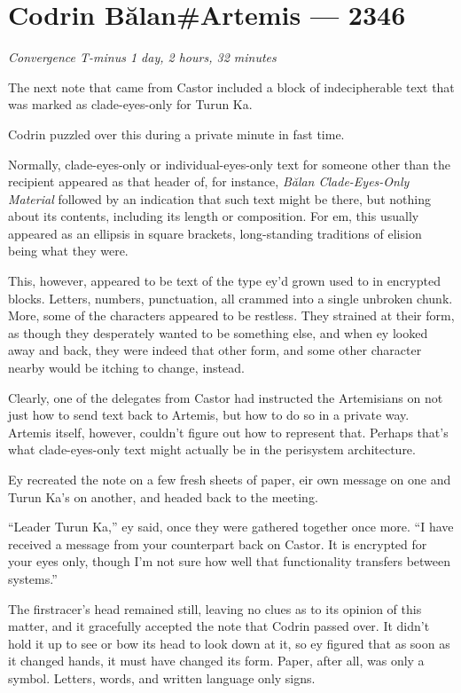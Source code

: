\hypertarget{codrin-bux103lanartemis-2346}{%
\chapter{Codrin Bălan\#Artemis — 2346}}

\begin{center}
\emph{Convergence T-minus 1 day, 2 hours, 32 minutes}
\end{center}

\noindent The next note that came from Castor included a block of indecipherable text that was marked as clade-eyes-only for Turun Ka.

Codrin puzzled over this during a private minute in fast time.

Normally, clade-eyes-only or individual-eyes-only text for someone other than the recipient appeared as that header of, for instance, \emph{Bălan Clade-Eyes-Only Material} followed by an indication that such text might be there, but nothing about its contents, including its length or composition. For em, this usually appeared as an ellipsis in square brackets, long-standing traditions of elision being what they were.

This, however, appeared to be text of the type ey'd grown used to in encrypted blocks. Letters, numbers, punctuation, all crammed into a single unbroken chunk. More, some of the characters appeared to be restless. They strained at their form, as though they desperately wanted to be something else, and when ey looked away and back, they were indeed that other form, and some other character nearby would be itching to change, instead.

Clearly, one of the delegates from Castor had instructed the Artemisians on not just how to send text back to Artemis, but how to do so in a private way. Artemis itself, however, couldn't figure out how to represent that. Perhaps that's what clade-eyes-only text might actually be in the perisystem architecture.

Ey recreated the note on a few fresh sheets of paper, eir own message on one and Turun Ka's on another, and headed back to the meeting.

``Leader Turun Ka,'' ey said, once they were gathered together once more. ``I have received a message from your counterpart back on Castor. It is encrypted for your eyes only, though I'm not sure how well that functionality transfers between systems.''

The firstracer's head remained still, leaving no clues as to its opinion of this matter, and it gracefully accepted the note that Codrin passed over. It didn't hold it up to see or bow its head to look down at it, so ey figured that as soon as it changed hands, it must have changed its form. Paper, after all, was only a symbol. Letters, words, and written language only signs.

